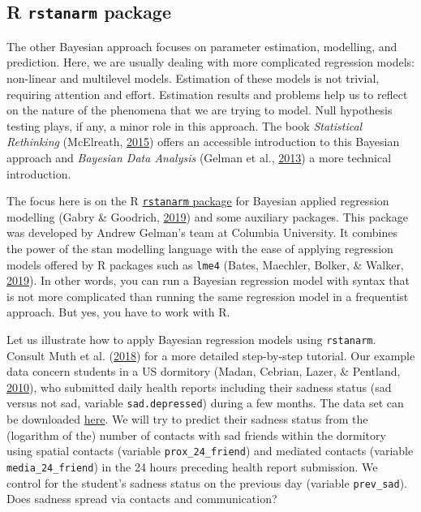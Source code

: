 \documentclass[doc]{apa6}
\begin{document}
\subsection{\texorpdfstring{R \texttt{rstanarm}
package}{R rstanarm package}}\label{r-rstanarm-package}

The other Bayesian approach focuses on parameter estimation, modelling,
and prediction. Here, we are usually dealing with more complicated
regression models: non-linear and multilevel models. Estimation of these
models is not trivial, requiring attention and effort. Estimation
results and problems help us to reflect on the nature of the phenomena
that we are trying to model. Null hypothesis testing plays, if any, a
minor role in this approach. The book \emph{Statistical Rethinking}
(McElreath,
\protect\hyperlink{ref-McElreathStatisticalRethinkingBayesian2015}{2015})
offers an accessible introduction to this Bayesian approach and
\emph{Bayesian Data Analysis} (Gelman et al.,
\protect\hyperlink{ref-GelmanBayesianDataAnalysis2013}{2013}) a more
technical introduction.

The focus here is on the R
\href{http://mc-stan.org/rstanarm/index.html}{\texttt{rstanarm} package}
for Bayesian applied regression modelling (Gabry \& Goodrich,
\protect\hyperlink{ref-R-rstanarm}{2019}) and some auxiliary packages.
This package was developed by Andrew Gelman's team at Columbia
University. It combines the power of the stan modelling language with
the ease of applying regression models offered by R packages such as
\texttt{lme4} (Bates, Maechler, Bolker, \& Walker,
\protect\hyperlink{ref-R-lme4}{2019}). In other words, you can run a
Bayesian regression model with syntax that is not more complicated than
running the same regression model in a frequentist approach. But yes,
you have to work with R.

Let us illustrate how to apply Bayesian regression models using
\texttt{rstanarm}. Consult Muth et al.
(\protect\hyperlink{ref-TQMP14-2-99}{2018}) for a more detailed
step-by-step tutorial. Our example data concern students in a US
dormitory (Madan, Cebrian, Lazer, \& Pentland,
\protect\hyperlink{ref-MadanSocialsensingepidemiological2010}{2010}),
who submitted daily health reports including their sadness status (sad
versus not sad, variable \texttt{sad.depressed}) during a few months.
The data set can be downloaded
\href{https://wdenooy.github.io/Switch2Bayesian/sadness.csv}{here}. We
will try to predict their sadness status from the (logarithm of the)
number of contacts with sad friends within the dormitory using spatial
contacts (variable \texttt{prox\_24\_friend}) and mediated contacts
(variable \texttt{media\_24\_friend}) in the 24 hours preceding health
report submission. We control for the student's sadness status on the
previous day (variable \texttt{prev\_sad}). Does sadness spread via
contacts and communication?
\end{document}
